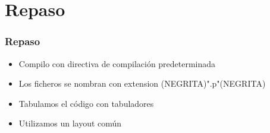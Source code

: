 \section{Repaso}

\begin{frame}
\frametitle{Repaso}

\begin{itemize}
	\item Compilo con directiva de compilación predeterminada
	\item Los ficheros se nombran con extension (NEGRITA)".p"(NEGRITA)
	\item Tabulamos el código con tabuladores
	\item Utilizamos un layout común
\end{itemize}

\end{frame}
